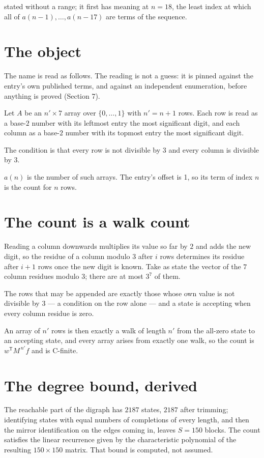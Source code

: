 \documentclass[11pt]{article}
\theoremstyle{definition}
\begin{document}
stated without a range; it first has meaning at $n = 18$, the least index at which all of $a(n-1),\dots,a(n-17)$ are terms of the sequence.

\section{The object}

The name is read as follows. The reading is not a guess: it is pinned against the entry's own published terms, and against an independent enumeration, before anything is proved (Section 7).

Let $A$ be an $n' \times 7$ array over $\{0,\dots,1\}$ with $n' = n + 1$ rows. Each row is read as a base-$2$ number with its leftmost entry the most significant digit, and each column as a base-$2$ number with its topmost entry the most significant digit.

The condition is that every row is not divisible by $3$ and every column is divisible by $3$.

$a(n)$ is the number of such arrays. The entry's offset is 1, so its term of index $n$ is the count for $n$ rows.

\section{The count is a walk count}

Reading a column downwards multiplies its value so far by $2$ and adds the new digit, so the residue of a column modulo $3$ after $i$ rows determines its residue after $i+1$ rows once the new digit is known. Take as state the vector of the $7$ column residues modulo $3$; there are at most $3^{7}$ of them.

The rows that may be appended are exactly those whose own value is not divisible by $3$ --- a condition on the row alone --- and a state is accepting when every column residue is zero.

An array of $n'$ rows is then exactly a walk of length $n'$ from the all-zero state to an accepting state, and every array arises from exactly one walk, so the count is $w^{\mathsf T}M^{\,n'}f$ and is C-finite.

\section{The degree bound, derived}

The reachable part of the digraph has $2187$ states, $2187$ after trimming; identifying states with equal numbers of completions of every length, and then the mirror identification on the edges coming in, leaves $S = 150$ blocks. The count satisfies the linear recurrence given by the characteristic polynomial of the resulting $150\times150$ matrix. That bound is computed, not assumed.
\end{document}
